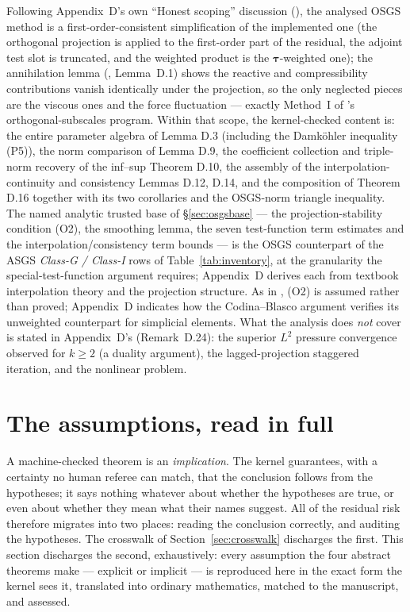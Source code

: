 \documentclass[11pt]{article}
\newcommand{\lbl}[1]{\texttt{\detokenize{#1}}}
\begin{document}
Following Appendix~D's own ``Honest scoping'' discussion (\lbl{oa:sec:discussion}),
the analysed OSGS method is
a first-order-consistent simplification of the implemented one (the orthogonal
projection is applied to the first-order part of the residual, the adjoint test
slot is truncated, and the weighted product is the $\boldsymbol\tau$-weighted one);
the annihilation lemma (\lbl{oa:lem:annihilation}, Lemma~D.1) shows the reactive and compressibility
contributions vanish identically under the projection, so the only neglected pieces
are the viscous ones and the force fluctuation --- exactly Method~I of
\cite{codina2001stabilized}'s orthogonal-subscales program. Within that scope, the
kernel-checked content is: the entire parameter algebra of Lemma D.3 (including the
Damk\"ohler inequality (P5)), the norm comparison of Lemma D.9, the coefficient
collection and triple-norm recovery of the inf--sup Theorem D.10, the assembly of
the interpolation-continuity and consistency Lemmas D.12, D.14, and the composition
of Theorem D.16 together with its two corollaries and the OSGS-norm triangle
inequality. The named analytic trusted base of \S\ref{sec:osgsbase} --- the
projection-stability condition (O2), the smoothing lemma, the seven test-function
term estimates and the interpolation/consistency term bounds --- is the OSGS
counterpart of the ASGS \emph{Class-G / Class-I} rows of Table~\ref{tab:inventory},
at the granularity the special-test-function argument requires; Appendix~D derives
each from textbook interpolation theory and the projection structure. As in
\cite{codina2001stabilized}, (O2) is assumed rather than proved; Appendix~D indicates
how the Codina--Blasco argument verifies its unweighted counterpart for simplicial
elements. What the analysis does \emph{not} cover is stated in Appendix~D's
\lbl{oa:rem:open} (Remark~D.24): the superior $L^2$ pressure convergence observed for $k\ge2$
(a duality argument), the lagged-projection staggered iteration, and the nonlinear
problem.

\section{The assumptions, read in full}\label{sec:assumptions}

A machine-checked theorem is an \emph{implication}. The kernel guarantees, with
a certainty no human referee can match, that the conclusion follows from the
hypotheses; it says nothing whatever about whether the hypotheses are true, or
even about whether they mean what their names suggest. All of the residual risk
therefore migrates into two places: reading the conclusion correctly, and
auditing the hypotheses. The crosswalk of Section~\ref{sec:crosswalk} discharges
the first. This section discharges the second, exhaustively: every assumption
the four abstract theorems make --- explicit or implicit --- is reproduced here
in the exact form the kernel sees it, translated into ordinary mathematics,
matched to the manuscript, and assessed.
\end{document}

